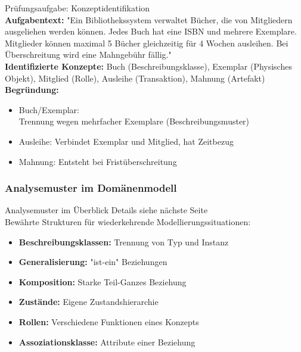 \begin{example2}{Prüfungsaufgabe: Konzeptidentifikation}\\
    \small
\textbf{Aufgabentext:} 
"Ein Bibliothekssystem verwaltet Bücher, die von Mitgliedern ausgeliehen werden können. Jedes Buch hat eine ISBN und mehrere Exemplare. Mitglieder können maximal 5 Bücher gleichzeitig für 4 Wochen ausleihen. Bei Überschreitung wird eine Mahngebühr fällig."
\vspace{2mm}\\
\textbf{Identifizierte Konzepte:}
Buch (Beschreibungsklasse), Exemplar (Physisches Objekt), Mitglied (Rolle), Ausleihe (Transaktion), Mahnung (Artefakt)
\vspace{2mm}\\
\textbf{Begründung:}
\begin{itemize}
    \item Buch/Exemplar: \\ Trennung wegen mehrfacher Exemplare (Beschreibungsmuster)
    \item Ausleihe: Verbindet Exemplar und Mitglied, hat Zeitbezug
    \item Mahnung: Entsteht bei Fristüberschreitung
\end{itemize}
\end{example2}


\subsubsection{Analysemuster im Domänenmodell}

\begin{concept}{Analysemuster im Überblick} Details siehe nächste Seite\\
Bewährte Strukturen für wiederkehrende Modellierungssituationen:
\begin{itemize}
    \item \textbf{Beschreibungsklassen:} Trennung von Typ und Instanz
    \item \textbf{Generalisierung:} "ist-ein" Beziehungen
    \item \textbf{Komposition:} Starke Teil-Ganzes Beziehung
    \item \textbf{Zustände:} Eigene Zustandshierarchie
    \item \textbf{Rollen:} Verschiedene Funktionen eines Konzepts
    \item \textbf{Assoziationsklasse:} Attribute einer Beziehung
\end{itemize}
\end{concept}


